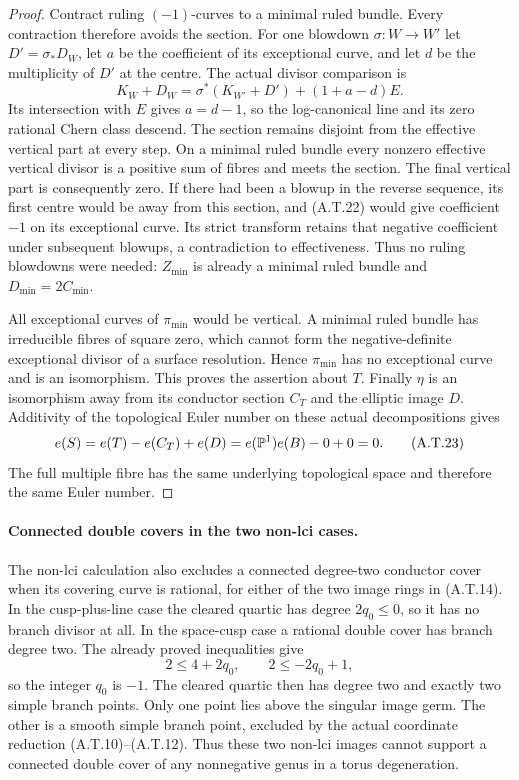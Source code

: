 \begin{proof}
Contract ruling $(-1)$-curves to a minimal ruled bundle.
Every contraction therefore avoids the section. For
one blowdown $\sigma:W\to W'$ let $D'=\sigma_*D_W$,
let $a$ be the coefficient of its exceptional curve,
and let $d$ be the multiplicity of $D'$ at the centre.
The actual divisor comparison is
\[
 K_W+D_W=\sigma^*(K_{W'}+D')+(1+a-d)E.
                                                        \tag{A.T.22}
\]
Its intersection with $E$ gives $a=d-1$, so the
log-canonical line and its zero rational Chern class
descend. The section remains disjoint from the
effective vertical part at every step. On a minimal
ruled bundle every nonzero effective vertical divisor
is a positive sum of fibres and meets the section.
The final vertical part is consequently zero. If
there had been a blowup in the reverse sequence,
its first centre would be away from this section,
and (A.T.22) would give coefficient $-1$ on its
exceptional curve. Its strict transform retains that
negative coefficient under subsequent blowups, a
contradiction to effectiveness. Thus no ruling
blowdowns were needed: $Z_{\min}$ is already a
minimal ruled bundle and $D_{\min}=2C_{\min}$.

All exceptional curves of $\pi_{\min}$ would be
vertical. A minimal ruled bundle has irreducible
fibres of square zero, which cannot form the
negative-definite exceptional divisor of a surface
resolution. Hence $\pi_{\min}$ has no exceptional
curve and is an isomorphism. This proves the assertion
about $T$. Finally $\eta$ is an isomorphism away from
its conductor section $C_T$ and the elliptic image
$D$. Additivity of the topological Euler number on
these actual decompositions gives
\[
 e(S)=e(T)-e(C_T)+e(D)
      =e(\mathbb P^1)e(B)-0+0=0.                       \tag{A.T.23}
\]
The full multiple fibre has the same underlying
topological space and therefore the same Euler number.
\end{proof}

\paragraph{Connected double covers in the two non-lci cases.}
The non-lci calculation also excludes a connected
degree-two conductor cover when its covering curve
is rational, for either of the two image rings in
(A.T.14). In the cusp-plus-line case the cleared
quartic has degree $2q_0\le0$, so it has no branch
divisor at all. In the space-cusp case a rational
double cover has branch degree two. The already
proved inequalities give
\[
                2\le4+2q_0,\qquad 2\le-2q_0+1,
\]
so the integer $q_0$ is $-1$. The cleared quartic
then has degree two and exactly two simple branch
points. Only one point lies above the singular
image germ. The other is a smooth simple branch
point, excluded by the actual coordinate reduction
(A.T.10)--(A.T.12). Thus these two non-lci images
cannot support a connected double cover of any
nonnegative genus in a torus degeneration.

